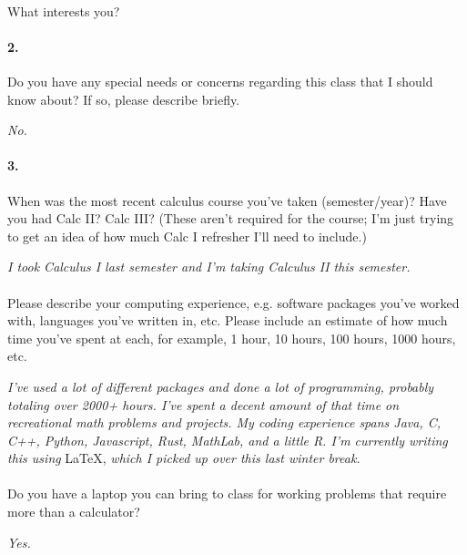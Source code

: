     \paragraph{ }    What interests you?
        \\ 
    

    \paragraph{2.} Do you have any special needs or concerns regarding this class that I should know about? If so, please describe briefly.
    \begin{mdframed}
        \emph{No.}
    \end{mdframed}
    
    \paragraph{3.} When was the most recent calculus course you've taken (semester/year)? Have you
    had Calc II? Calc III? (These aren't required for the course; I'm just trying to get an
    idea of how much Calc I refresher I'll need to include.)
    \begin{mdframed}
        \emph{I took Calculus I last semester and I'm taking Calculus II this semester.}
    \end{mdframed}

    \paragraph{} Please describe your computing experience, e.g. software packages you've worked with, languages you've written in, etc. Please include an estimate of how much time you've
    spent at each, for example, 1 hour, 10 hours, 100 hours, 1000 hours, etc.
    \begin{mdframed}
        \emph{I've used a lot of different packages and done a lot of programming, probably totaling over 2000+ hours. I've spent a decent amount of that time on recreational math problems and projects. My coding experience spans Java, C, C++, Python, Javascript, Rust, MathLab, and a little R. I'm currently writing this using} \LaTeX, \emph{which I picked up over this last winter break.}
    \end{mdframed}

    \paragraph{} Do you have a laptop you can bring to class for working problems that require more than a calculator?
    \begin{mdframed}
        \emph{Yes.}
    \end{mdframed}


